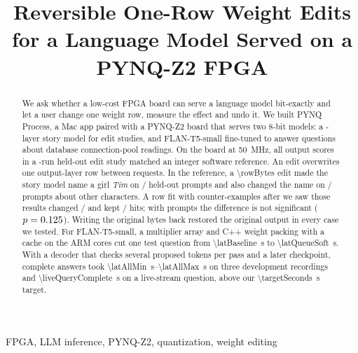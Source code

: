 \documentclass[conference,10pt,letterpaper]{IEEEtran}
\newcommand{\seconds}[1]{\SI{#1}{\second}}
\newcommand{\secrange}[2]{\SIrange{#1}{#2}{\second}}
\newcommand{\pynq}{\mbox{PYNQ-Z2}}
\newcommand{\flan}{\mbox{FLAN-T5-small}}
\newcommand{\eightbit}{\mbox{8-bit}}
\begin{document}
\title{Reversible One-Row Weight Edits for a Language Model Served on a PYNQ-Z2 FPGA}

\author{\and{}}

\maketitle

\begin{abstract}
We ask whether a low-cost FPGA board can serve a language model bit-exactly and let a user change one weight row, measure the effect and undo it. We built PYNQ Process, a Mac app paired with a \pynq{} board that serves two \eightbit{} models: a \storiesLayers-layer story model for edit studies, and \flan{} fine-tuned to answer questions about database connection-pool readings. On the board at \SI{50}{\mega\hertz}, all \lmBoardScores{} output scores in a \lmRuns-run held-out edit study matched an integer software reference. An edit overwrites one output-layer row between requests. In the reference, a \SI{\rowBytes}{\byte} edit made the story model name a girl \emph{Tim} on \conventionalHits/\extTargets{} held-out prompts and also changed the name on \conventionalLeaks/\extNaming{} prompts about other characters. A row fit with counter-examples after we saw those results changed \contrastiveLeaks/\extNaming{} and kept \contrastiveHits/\extTargets{} hits; with \extNaming{} prompts the difference is not significant ({\boldmath$p=0.125$}). Writing the original bytes back restored the original output in every case we tested. For \flan, a multiplier array and C++ weight packing with a cache on the ARM cores cut one test question from \seconds{\latBaseline} to \seconds{\latQueueSoft}. With a decoder that checks several proposed tokens per pass and a later checkpoint, complete answers took \secrange{\latAllMin}{\latAllMax} on three development recordings and \seconds{\liveQueryComplete} on a live-stream question, above our \seconds{\targetSeconds} target.
\end{abstract}

\begin{IEEEkeywords}
FPGA, LLM inference, PYNQ-Z2, quantization, weight editing
\end{IEEEkeywords}
\end{document}
